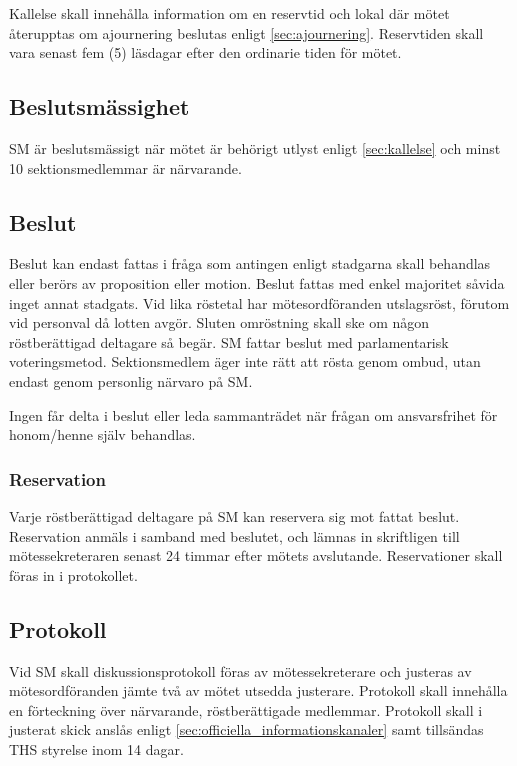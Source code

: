 \documentclass[a4paper,12pt]{article}
\begin{document}
Kallelse skall innehålla information om en reservtid och lokal där mötet återupptas om ajournering beslutas enligt \ref{sec:ajournering}. Reservtiden skall vara senast fem (5) läsdagar efter den ordinarie tiden för mötet.

\subsection{Beslutsmässighet}

SM är beslutsmässigt när mötet är behörigt utlyst enligt 
\ref{sec:kallelse} och minst 10 sektionsmedlemmar är närvarande.

\subsection{Beslut}

Beslut kan endast fattas i fråga som antingen enligt stadgarna skall behandlas eller berörs av proposition eller motion. Beslut fattas med enkel majoritet såvida inget annat stadgats. Vid lika röstetal har mötesordföranden utslagsröst, förutom vid personval då lotten avgör. Sluten omröstning skall ske om någon röstberättigad deltagare så begär. SM fattar beslut med parlamentarisk voteringsmetod. Sektionsmedlem äger inte rätt att rösta genom ombud, utan endast genom personlig närvaro på SM.

Ingen får delta i beslut eller leda sammanträdet när frågan om ansvarsfrihet för honom/henne själv behandlas.

\subsubsection{Reservation}

Varje röstberättigad deltagare på SM kan reservera sig mot fattat beslut. Reservation anmäls i samband med beslutet, och lämnas in skriftligen till mötessekreteraren senast 24 timmar efter mötets avslutande. Reservationer skall föras in i protokollet.

\subsection{Protokoll}

Vid SM skall diskussionsprotokoll föras av mötessekreterare och justeras av mötesordföranden jämte två av mötet utsedda justerare. Protokoll skall innehålla en förteckning över närvarande, röstberättigade medlemmar. Protokoll skall i justerat skick anslås enligt \ref{sec:officiella_informationskanaler} samt tillsändas THS styrelse inom 14 dagar.
\end{document}
